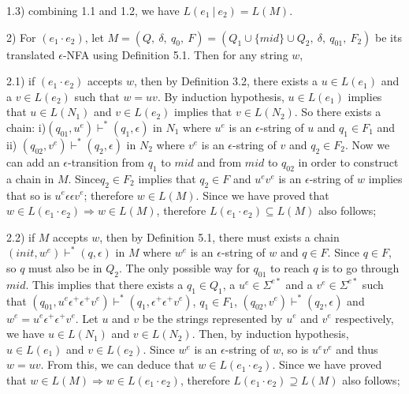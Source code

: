 \documentclass[twoside,openright,final]{bhamthesis}
\begin{document}
\par 1.3) combining 1.1  and 1.2, we have \(L(e_1\ |\ e_2) = L(M)\). 

\par 2) For \((e_1 \cdot e_2)\), let \(M = (Q,\ \delta,\ q_0,\ F) = (Q_1 \cup \{mid\} \cup Q_2,\ \delta,\ q_{01},\ F_2)\) be its
translated \(\epsilon\)-NFA using Definition 5.1. Then for any string
\(w\), 

\par 2.1) if \((e_1 \cdot e_2)\) accepts \(w\), then by Definition
3.2, there exists a \(u \in L(e_1)\) and a \(v \in L(e_2)\) such that \(w
= uv\). By induction hypothesis, \(u \in L(e_1)\) implies that \(u \in
L(N_1)\) and \(v \in L(e_2)\) implies that \(v \in L(N_2)\). So there
exists a chain: i)\((q_{01} ,
u^e) \vdash^* (q_1 , \epsilon)\) in \(N_1\) where
\(u^e\) is an \(\epsilon\)-string of \(u\) and \(q_1 \in F_1\) and
ii) \((q_{02} , v^e) \vdash^* (q_2 , \epsilon)\) in \(N_2\)
where \(v^e\) is an \(\epsilon\)-string of \(v\) and \(q_2 \in
F_2\). Now we can add an \(\epsilon\)-transition from \(q_1\) to \(mid\) and
from \(mid\) to \(q_{02}\) in order to construct a chain in
\(M\). Since\(q_2
\in F_2\) implies that \(q_2 \in F\) and \(u^ev^e\) is an
\(\epsilon\)-string of \(w\) implies that so is \(u^e\epsilon \epsilon
v^e\); therefore \(w \in L(M)\). Since we have proved that \(w \in
L(e_1 \cdot e_2) \Rightarrow w \in L(M)\), therefore \(L(e_1 \cdot
e_2) \subseteq L(M)\) also follows;

\par 2.2) if \(M\) accepts \(w\), then by Definition 5.1, there must exists
a chain \((init , w^e) \vdash^* (q , \epsilon)\) in \(M\) where
\(w^e\) is an \(\epsilon\)-string of \(w\) and \(q \in F\). Since \(q
\in F\), so \(q\) must also be in \(Q_2\). The only possible way for
\(q_{01}\) to reach \(q\) is to go through \(mid\). This implies that
there exists a \(q_1 \in Q_1\), a \(u^e \in \Sigma^{e*}\) and a \(v^e \in
\Sigma^{e*}\) such that \((q_{01} , u^e\epsilon^+ \epsilon^+ v^e) \vdash^*
(q_1 , \epsilon^+ \epsilon^+ v^e)\), \(q_1 \in F_1\), \((q_{02} , v^e)
\vdash^* (q_2 , \epsilon)\) and \(w^e = u^e\epsilon^+ \epsilon^+
v^e\). Let \(u\) and \(v\) be the strings represented by \(u^e\) and
\(v^e\) respectively, we have \(u \in L(N_1)\) and \(v \in
L(N_2)\). Then, by induction hypothesis, \(u \in L(e_1)\) and \(v \in
L(e_2)\). Since \(w^e\) is an \(\epsilon\)-string of \(w\), so is
\(u^ev^e\) and thus \(w =
uv\). From this, we can deduce that \(w \in L(e_1 \cdot e_2)\). Since
we have proved that \(w \in L(M) \Rightarrow w \in L(e_1 \cdot e_2)\),
therefore \(L(e_1 \cdot e_2) \supseteq L(M)\) also follows;
\end{document}
